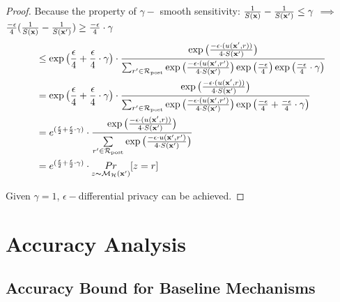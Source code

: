 \documentclass{article}
\begin{document}
\begin{proof}
  Because the property of $\gamma -$ smooth sensitivity: $\frac{1}{S(\textbf{x})} - \frac{1}{S(\textbf{x}')} \leq \gamma$ $\implies$
  $\frac{- \epsilon}{4}
  (\frac{1}{S(\textbf{x})}-
  \frac{1}{S(\textbf{x}')}) \geq \frac{- \epsilon}{4} \cdot \gamma$
  \begin{equation*}
  \begin{split}
  & \leq \exp\big( \frac{\epsilon}{4} + \frac{\epsilon}{4} \cdot \gamma\big) \cdot 
  \frac {
  \exp
  \big(
  \frac{-\epsilon\cdot(u(\textbf{x}', {r}))}{4\cdot S(\textbf{x}')}
  \big)
  } 
  {
  \sum_{r'\in \mathcal{R}_{\textup{post}}} 
  \exp 
  \big(
  \frac{-\epsilon\cdot(u(\textbf{x}', {r'})}{4 \cdot S(\textbf{x}')}
  \big)
  \exp 
  \big(
  \frac{-\epsilon}{4}
  \big)
  \exp
  \big(
  \frac{- \epsilon}{4} \cdot \gamma
  \big)
  }\\
  & = \exp\big( \frac{\epsilon}{4} + \frac{\epsilon}{4} \cdot \gamma\big) \cdot 
  \frac {
  \exp
  \big(
  \frac{-\epsilon\cdot(u(\textbf{x}', {r}))}{4\cdot S(\textbf{x}')}
  \big)
  } 
  {
  \sum_{r'\in \mathcal{R}_{\textup{post}}} 
  \exp 
  \big(
  \frac{-\epsilon\cdot(u(\textbf{x}', {r'})}{4 \cdot S(\textbf{x}')}
  \big)
  \exp 
  \big(
  \frac{-\epsilon}{4} +   \frac{- \epsilon}{4} \cdot \gamma
  \big)
  }\\
  & = e^{( \frac{\epsilon}{2} + \frac{\epsilon}{2} \cdot \gamma )} \cdot 
  \frac {
  \exp
  \big(
  \frac{-\epsilon\cdot(u(\textbf{x}', {r}))}{4\cdot S(\textbf{x}')}
  \big)
  } 
  {
  \sum\limits_{r'\in \mathcal{R}_{\textup{post}}} \exp \big(\frac{-\epsilon\cdot u(\textbf{x}', r')}{4 \cdot S(\textbf{x}')}\big)
  }\\
  & = e^{( \frac{\epsilon}{2} + \frac{\epsilon}{2} \cdot \gamma )} \cdot   \underset{z \thicksim \mathcal{M}_{\mathcal{H}}(\textbf{x}')}{Pr}[z = r]
  \end{split}
  \end{equation*}

  Given $\gamma = 1$, $\epsilon - $differential privacy can be achieved.


\end{proof}



\section{Accuracy Analysis}

\subsection{Accuracy Bound for Baseline Mechanisms}

\end{document}
